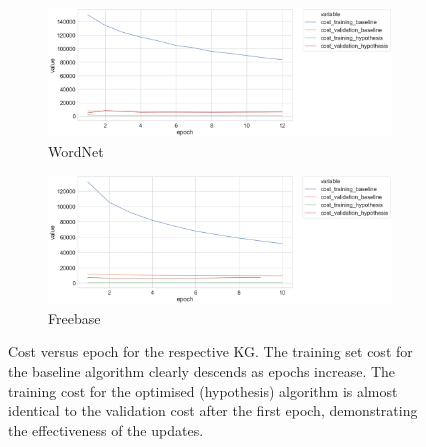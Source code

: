 \begin{figure}[H]
	\begin{subfigure}[b]{.5\linewidth}
   		\centering
    		\includegraphics[width=1.0\linewidth, height=0.6\linewidth]{Wordnet_Cost_Results_Early_Stopping}
		\captionsetup{justification=centering}
		\caption{WordNet}
	\end{subfigure}
	\begin{subfigure}[b]{.5\linewidth}
   		\centering
		\includegraphics[width=1.0\linewidth, height=0.6\linewidth]{Freebase_Cost_Results}
		\captionsetup{justification=centering}
		\caption{Freebase}
	\end{subfigure}
	\captionsetup{justification=centering}
	\caption{Cost versus epoch for the respective KG. The training set cost for the baseline algorithm clearly descends as epochs increase. The training cost for the optimised (hypothesis) algorithm is almost identical to the validation cost after the first epoch, demonstrating the effectiveness of the updates. }
\end{figure}

